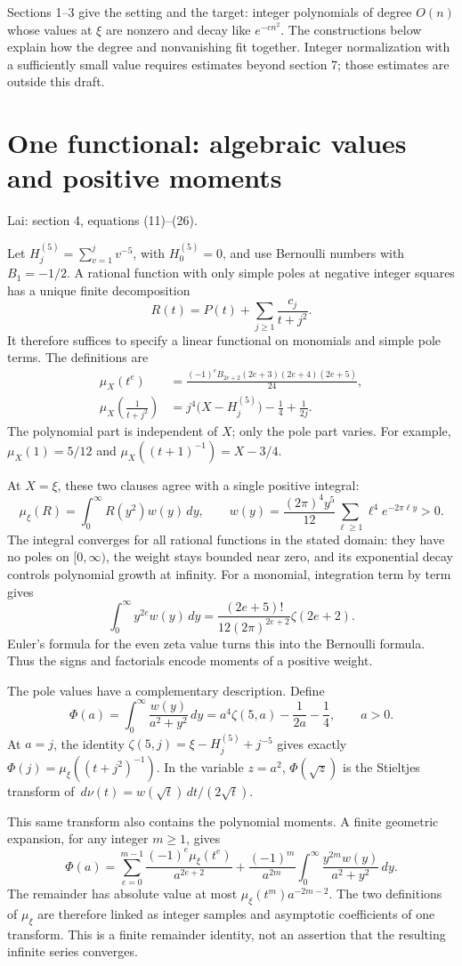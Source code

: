 \documentclass[11pt]{article}
\newcommand{\dd}{\,d}
\newcommand{\Hfive}[1]{H_{#1}^{(5)}}
\newcommand{\source}[1]{{\small\color{blue!45!black}Lai: #1.}\par}
\newcommand{\pagetitle}[2]{\section*{#1}\source{#2}}
\begin{document}
Sections 1--3 give the setting and the target: integer polynomials of degree
$O(n)$ whose values at $\xi$ are nonzero and decay like $e^{-cn^2}$.
The constructions below explain how the degree and nonvanishing fit together.
Integer normalization with a sufficiently small value requires estimates
beyond section 7; those estimates are outside this draft.

\newpage
\pagetitle{One functional: algebraic values and positive moments}
{section 4, equations (11)--(26)}
Let $\Hfive{j}=\sum_{v=1}^{j}v^{-5}$, with $\Hfive{0}=0$, and use
Bernoulli numbers with $B_1=-1/2$. A rational function with only simple poles
at negative integer squares has a unique finite decomposition
\[
 R(t)=P(t)+\sum_{j\geq1}\frac{c_j}{t+j^2}.
\]
It therefore suffices to specify a linear functional on monomials and simple
pole terms. The definitions are
\begin{align*}
 \mu_X(t^e)&=\frac{(-1)^e B_{2e+2}(2e+3)(2e+4)(2e+5)}{24},\\
 \mu_X\!\left(\frac1{t+j^2}\right)
 &=j^4\bigl(X-\Hfive{j}\bigr)-\frac14+\frac1{2j}.
\end{align*}
The polynomial part is independent of $X$; only the pole part varies.
For example, $\mu_X(1)=5/12$ and $\mu_X((t+1)^{-1})=X-3/4$.

At $X=\xi$, these two clauses agree with a single positive integral:
\[
 \mu_\xi(R)=\int_0^\infty R(y^2)w(y)\dd y,\qquad
 w(y)=\frac{(2\pi)^4y^5}{12}\sum_{\ell\geq1}\ell^4e^{-2\pi\ell y}>0.
\]
The integral converges for all rational functions in the stated domain:
they have no poles on $[0,\infty)$, the weight stays bounded near zero,
and its exponential decay controls polynomial growth at infinity.
For a monomial, integration term by term gives
\[
 \int_0^\infty y^{2e}w(y)\dd y
 =\frac{(2e+5)!}{12(2\pi)^{2e+2}}\zeta(2e+2).
\]
Euler's formula for the even zeta value turns this into the Bernoulli formula.
Thus the signs and factorials encode moments of a positive weight.

The pole values have a complementary description. Define
\[
 \Phi(a)=\int_0^\infty\frac{w(y)}{a^2+y^2}\dd y
 =a^4\zeta(5,a)-\frac1{2a}-\frac14,\qquad a>0.
\]
At $a=j$, the identity
$\zeta(5,j)=\xi-\Hfive{j}+j^{-5}$ gives exactly
$\Phi(j)=\mu_\xi((t+j^2)^{-1})$.
In the variable $z=a^2$, $\Phi(\sqrt z)$ is the Stieltjes transform of
$\dd\nu(t)=w(\sqrt t)\dd t/(2\sqrt t)$.

This same transform also contains the polynomial moments. A finite geometric
expansion, for any integer $m\geq1$, gives
\[
 \Phi(a)=\sum_{e=0}^{m-1}\frac{(-1)^e\mu_\xi(t^e)}{a^{2e+2}}
 +\frac{(-1)^m}{a^{2m}}\int_0^\infty
       \frac{y^{2m}w(y)}{a^2+y^2}\dd y.
\]
The remainder has absolute value at most $\mu_\xi(t^m)a^{-2m-2}$.
The two definitions of $\mu_\xi$ are therefore linked as integer samples
and asymptotic coefficients of one transform. This is a finite remainder
identity, not an assertion that the resulting infinite series converges.
\end{document}
